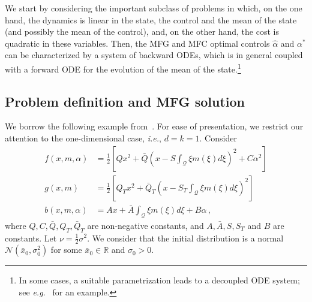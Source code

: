 \documentclass{amsproc}
\theoremstyle{definition}
\theoremstyle{remark}
\numberwithin{equation}{section}
\newcommand{\RR}{{\mathbb R}}
\newcommand{\ctrl}{\alpha}
\newcommand{\ctrldim}{k}
\newcommand{\dom}{\mathcal{Q}}
\begin{document}
We start by considering the important subclass of problems in which, on the one hand, the dynamics is linear in the state, the control and the mean of the state (and possibly the mean of the control), and, on the other hand, the cost is quadratic in these variables. Then, the MFG and MFC optimal controls $\hat\ctrl$ and $\ctrl^*$ can be characterized by a system of backward ODEs, which is in general coupled with a forward ODE for the evolution of the mean of the state.\footnote{In some cases, a suitable parametrization leads to a decoupled ODE system; see \textit{e.g.}~\cite{gravesmalhame-AMS-tmp} for an example.}




\subsection{Problem definition and MFG solution}
\label{AMS-num-sec:LQ-pb}
We borrow the following example from~\cite[Chapter 6]{MR3134900}. For ease of presentation, we restrict our attention to the one-dimensional case, \textit{i.e.}, $d=\ctrldim=1$. Consider
\begin{align*}
	f(x,m,\ctrl)	&= \frac{1}{2} \left[ Q x^2 + \bar{Q} \left(x - S \int_{\dom} \xi m(\xi) d\xi \right)^2 + C \ctrl^2 \right]
	\\
	g(x,m) 	&= \frac{1}{2} \left[ Q_T x^2 + \bar{Q}_T \left(x - S_T \int_{\dom} \xi m(\xi) d\xi \right)^2 \right]
	\\
	b(x,m,\ctrl) 	&= Ax + \bar{A} \int_{\dom} \xi m(\xi) d\xi + B\ctrl \, ,
\end{align*}
where $Q, C, \bar{Q}, Q_T, \bar{Q}_T$ are non-negative constants, and $A, \bar{A}, S, S_T$ and $B$ are constants. Let $\nu = \tfrac{1}{2} \sigma^2$.  We consider that the initial distribution is a normal $\mathcal{N}(\bar x_0, \sigma_0^2)$ for some $\bar{x}_0 \in \RR$ and $\sigma_0>0$.
\end{document}
